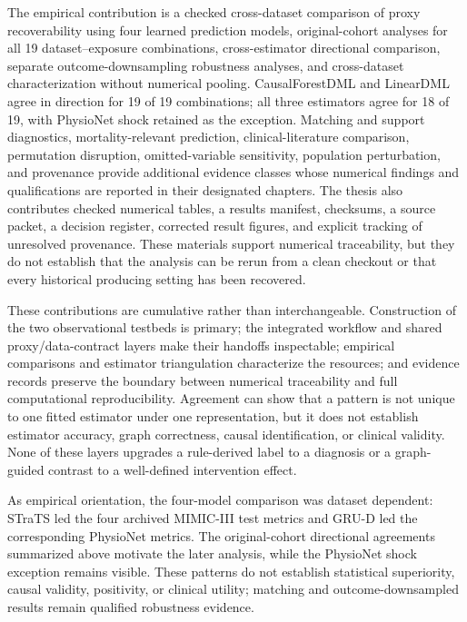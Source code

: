 The empirical contribution is a checked cross-dataset comparison of proxy recoverability using four learned prediction models, original-cohort analyses for all 19 dataset--exposure combinations, cross-estimator directional comparison, separate outcome-downsampling robustness analyses, and cross-dataset characterization without numerical pooling.  CausalForestDML and LinearDML agree in direction for 19 of 19 combinations; all three estimators agree for 18 of 19, with PhysioNet shock retained as the exception.  Matching and support diagnostics, mortality-relevant prediction, clinical-literature comparison, permutation disruption, omitted-variable sensitivity, population perturbation, and provenance provide additional evidence classes whose numerical findings and qualifications are reported in their designated chapters.  The thesis also contributes checked numerical tables, a results manifest, checksums, a source packet, a decision register, corrected result figures, and explicit tracking of unresolved provenance.  These materials support numerical traceability, but they do not establish that the analysis can be rerun from a clean checkout or that every historical producing setting has been recovered.

These contributions are cumulative rather than interchangeable.  Construction of the two observational testbeds is primary; the integrated workflow and shared proxy/data-contract layers make their handoffs inspectable; empirical comparisons and estimator triangulation characterize the resources; and evidence records preserve the boundary between numerical traceability and full computational reproducibility.  Agreement can show that a pattern is not unique to one fitted estimator under one representation, but it does not establish estimator accuracy, graph correctness, causal identification, or clinical validity.  None of these layers upgrades a rule-derived label to a diagnosis or a graph-guided contrast to a well-defined intervention effect.

As empirical orientation, the four-model comparison was dataset dependent: STraTS led the four archived MIMIC-III test metrics and GRU-D led the corresponding PhysioNet metrics.  The original-cohort directional agreements summarized above motivate the later analysis, while the PhysioNet shock exception remains visible.  These patterns do not establish statistical superiority, causal validity, positivity, or clinical utility; matching and outcome-downsampled results remain qualified robustness evidence.

